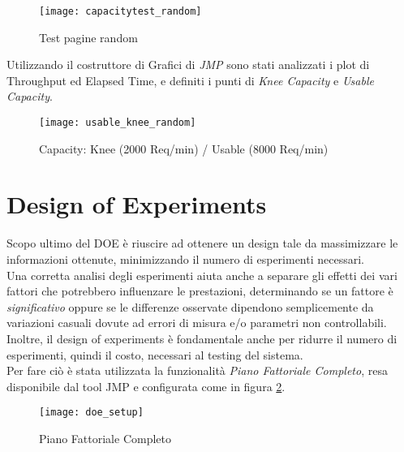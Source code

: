 \begin{figure}[!htbp]
  \centering
  \texttt{[image: capacitytest\_random]}
  \caption{Test pagine random}
  \label{webserver_random_page_summary_report}
\end{figure}

Utilizzando il costruttore di Grafici di \textit{JMP} sono stati analizzati i plot
di Throughput ed Elapsed Time, e definiti i punti di \textit{Knee Capacity} e
\textit{Usable Capacity}.\\

\begin{figure}[!htbp]
  \centering
  \texttt{[image: usable\_knee\_random]}
  \caption{Capacity: Knee (2000 Req/min) / Usable (8000 Req/min)}
\end{figure}

\clearpage

\section{Design of Experiments}
Scopo ultimo del DOE è riuscire ad ottenere un design tale da
massimizzare le informazioni ottenute, minimizzando il numero di esperimenti
necessari.\\
Una corretta analisi degli esperimenti aiuta anche a separare gli effetti dei
vari fattori che potrebbero influenzare le prestazioni, determinando se un fattore
è \textit{significativo} oppure se le differenze osservate dipendono semplicemente
da variazioni casuali dovute ad errori di misura e/o parametri non controllabili.\\
Inoltre, il design of experiments è fondamentale anche per ridurre il numero di
esperimenti, quindi il costo, necessari al testing del sistema.\\
Per fare ciò è stata utilizzata la funzionalità \textit{Piano Fattoriale Completo},
resa disponibile dal tool JMP e configurata come in figura \ref{webserver_piano_fattoriale_completo}.\\

\begin{figure}[!htbp]
  \centering
  \texttt{[image: doe\_setup]}
  \caption{Piano Fattoriale Completo}
  \label{webserver_piano_fattoriale_completo}
\end{figure}

\clearpage

